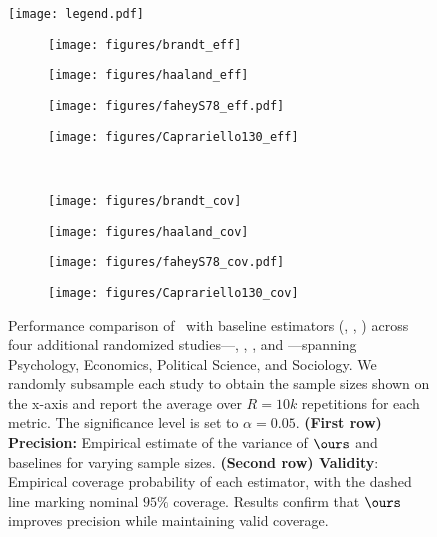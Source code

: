 \begin{figure*}[t!]
    \centering
    \texttt{[image: legend.pdf]}\vspace{2mm}\\
       
    \begin{subfigure}[t]{0.245\textwidth}
        \texttt{[image: figures/brandt\_eff]}
        \caption{}
        \label{fig:brandt_eff}
    \end{subfigure}\hfill
     \begin{subfigure}[t]{0.245\textwidth}
\texttt{[image: figures/haaland\_eff]}
        \caption{}
        \label{fig:haaland_eff}
    \end{subfigure}
    \begin{subfigure}[t]{0.245\textwidth}
        \texttt{[image: figures/faheyS78\_eff.pdf]}
        \caption{}
        \label{fig:fahey_eff}
    \end{subfigure}
    \begin{subfigure}[t]{0.245\textwidth}
        \texttt{[image: figures/Caprariello130\_eff]}
        \caption{}
        \label{fig:Caprariello130_eff}
    \end{subfigure}\\
    \begin{subfigure}[t]{0.245\textwidth}
\texttt{[image: figures/brandt\_cov]}
        \caption{}
        \label{fig:brandt_cov}
    \end{subfigure}
      \hfill
    \begin{subfigure}[t]{0.245\textwidth}
    \texttt{[image: figures/haaland\_cov]}
        \caption{}
        \label{fig:haaland_cov}
    \end{subfigure}\hfill
    \begin{subfigure}[t]{0.245\textwidth}
    \texttt{[image: figures/faheyS78\_cov.pdf]}
        \caption{}
        \label{fig:fahey_cov}
    \end{subfigure}
     \hfill
    \begin{subfigure}[t]{0.245\textwidth}
    \texttt{[image: figures/Caprariello130\_cov]}
        \caption{}
        \label{fig:Caprariello130_cov}
    \end{subfigure}    

\caption{\small{Performance comparison of \ours~with baseline estimators (\ppct, \dm, \aipw) across four additional randomized studies—\citet{brandt2013onset}, \citet{haaland2023beliefs}, \citet{fahey2023principled}, and \citet{caprariello2013have}—spanning Psychology, Economics, Political Science, and Sociology.  We randomly subsample each study to obtain the sample sizes shown on the x-axis and report the average over $R=10k$ repetitions for each metric. The significance level is set to $\alpha=0.05$. 
 \textbf{(First row) Precision:} Empirical estimate of the variance of $\ours$ and baselines for varying sample sizes. \textbf{(Second row) Validity}: Empirical coverage probability of each estimator, with the dashed line marking nominal $95\%$ coverage. Results confirm that $\ours$ improves precision while maintaining valid coverage. }}
    

\end{figure*}
